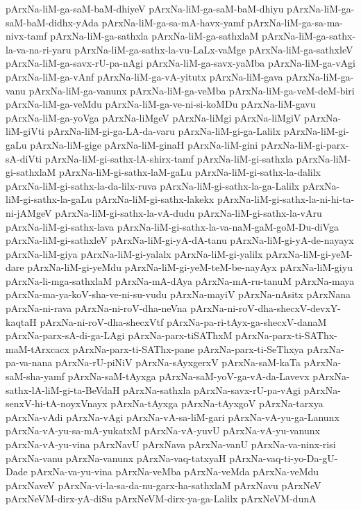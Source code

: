 {pArxNa-liM-ga-saM-baM-dhiyeV
pArxNa-liM-ga-saM-baM-dhiyu
pArxNa-liM-ga-saM-baM-didhx-yAda
pArxNa-liM-ga-sa-mA-havx-yamf
pArxNa-liM-ga-sa-ma-nivx-tamf
pArxNa-liM-ga-sathxla
pArxNa-liM-ga-sathxlaM
pArxNa-liM-ga-sathx-la-va-na-ri-yaru
pArxNa-liM-ga-sathx-la-vu-LaLx-vaMge
pArxNa-liM-ga-sathxleV
pArxNa-liM-ga-savx-rU-pa-nAgi
pArxNa-liM-ga-savx-yaMba
pArxNa-liM-ga-vAgi
pArxNa-liM-ga-vAnf
pArxNa-liM-ga-vA-yitutx
pArxNa-liM-gava
pArxNa-liM-ga-vanu
pArxNa-liM-ga-vanunx
pArxNa-liM-ga-veMba
pArxNa-liM-ga-veM-deM-biri
pArxNa-liM-ga-veMdu
pArxNa-liM-ga-ve-ni-si-koMDu
pArxNa-liM-gavu
pArxNa-liM-ga-yoVga
pArxNa-liMgeV
pArxNa-liMgi
pArxNa-liMgiV
pArxNa-liM-giVti
pArxNa-liM-gi-ga-LA-da-varu
pArxNa-liM-gi-ga-Lalilx
pArxNa-liM-gi-gaLu
pArxNa-liM-gige
pArxNa-liM-ginaH
pArxNa-liM-gini
pArxNa-liM-gi-parx-sA-diVti
pArxNa-liM-gi-sathx-lA-shirx-tamf
pArxNa-liM-gi-sathxla
pArxNa-liM-gi-sathxlaM
pArxNa-liM-gi-sathx-laM-gaLu
pArxNa-liM-gi-sathx-la-dalilx
pArxNa-liM-gi-sathx-la-da-lilx-ruva
pArxNa-liM-gi-sathx-la-ga-Lalilx
pArxNa-liM-gi-sathx-la-gaLu
pArxNa-liM-gi-sathx-lakekx
pArxNa-liM-gi-sathx-la-ni-hi-ta-ni-jAMgeV
pArxNa-liM-gi-sathx-la-vA-dudu
pArxNa-liM-gi-sathx-la-vAru
pArxNa-liM-gi-sathx-lava
pArxNa-liM-gi-sathx-la-va-naM-gaM-goM-Du-diVga
pArxNa-liM-gi-sathxleV
pArxNa-liM-gi-yA-dA-tanu
pArxNa-liM-gi-yA-de-nayayx
pArxNa-liM-giya
pArxNa-liM-gi-yalalx
pArxNa-liM-gi-yalilx
pArxNa-liM-gi-yeM-dare
pArxNa-liM-gi-yeMdu
pArxNa-liM-gi-yeM-teM-be-nayAyx
pArxNa-liM-giyu
pArxNa-li-mga-sathxlaM
pArxNa-mA-dAya
pArxNa-mA-ru-tanuM
pArxNa-maya
pArxNa-ma-ya-koV-sha-ve-ni-su-vudu
pArxNa-mayiV
pArxNa-nAsitx
pArxNana
pArxNa-ni-rava
pArxNa-ni-roV-dha-neVna
pArxNa-ni-roV-dha-shecxV-devxY-kaqtaH
pArxNa-ni-roV-dha-shecxVtf
pArxNa-pa-ri-tAyx-ga-shecxV-danaM
pArxNa-parx-sA-di-ga-LAgi
pArxNa-parx-tiSAThxM
pArxNa-parx-ti-SAThx-maM-tArxcacx
pArxNa-parx-ti-SAThx-pane
pArxNa-parx-ti-SeThxya
pArxNa-pa-va-nana
pArxNa-rU-piNiV
pArxNa-sAyxgerxV
pArxNa-saM-kaTa
pArxNa-saM-sha-yamf
pArxNa-saM-tAyxga
pArxNa-saM-yoV-ga-vA-da-Lavevx
pArxNa-sathx-lA-liM-gi-ta-BeVdaH
pArxNa-sathxla
pArxNa-savx-rU-pa-vAgi
pArxNa-senxV-hi-tA-noyxVnayx
pArxNa-tAyxga
pArxNa-tAyxgoV
pArxNa-tarxya
pArxNa-vAdi
pArxNa-vAgi
pArxNa-vA-sa-liM-gari
pArxNa-vA-yu-ga-Lanunx
pArxNa-vA-yu-sa-mA-yukatxM
pArxNa-vA-yuvU
pArxNa-vA-yu-vanunx
pArxNa-vA-yu-vina
pArxNavU
pArxNava
pArxNa-vanU
pArxNa-va-ninx-risi
pArxNa-vanu
pArxNa-vanunx
pArxNa-vaq-tatxyaH
pArxNa-vaq-ti-yo-Da-gU-Dade
pArxNa-va-yu-vina
pArxNa-veMba
pArxNa-veMda
pArxNa-veMdu
pArxNaveV
pArxNa-vi-la-sa-da-nu-garx-ha-sathxlaM
pArxNavu
pArxNeV
pArxNeVM-dirx-yA-diSu
pArxNeVM-dirx-ya-ga-Lalilx
pArxNeVM-dunA
}
